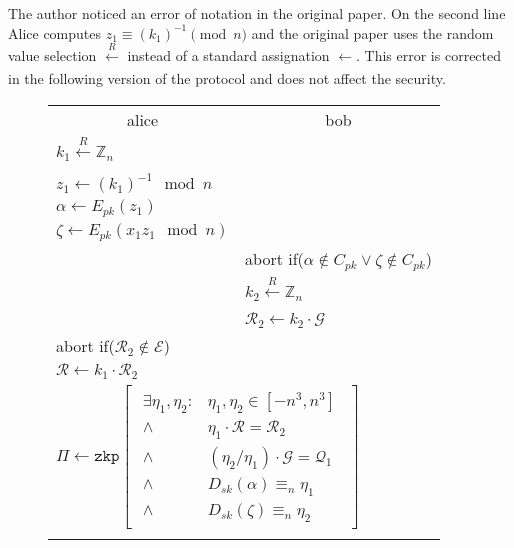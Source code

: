 The author noticed an error of notation in the original paper. On the second
line Alice computes $z_1 \equiv (k_1)^{-1} \pmod n$ and the original paper uses
the random value selection $\xleftarrow[]{R}$ instead of a standard assignation
$\leftarrow$. This error is corrected in the following version of the protocol
and does not affect the security.

\newpage

\begin{figure}[H]
    \begin{table}[H]
      \centering
      \begin{footnotesize}
      {\renewcommand{\arraystretch}{1.2}%
      \begin{tabular}{ | l l | }
        \hline
        \multicolumn{1}{|c}{alice}  & \multicolumn{1}{c|}{bob} \\
        $k_1 \xleftarrow[]{R} \mathbb{Z}_{n}$ & \\
        $z_1 \leftarrow (k_1)^{-1} \mod n$ & \\
        $\alpha \leftarrow E_{pk}(z_1)$ & \\
        $\zeta \leftarrow E_{pk}(x_1z_1 \mod n)$ & \\[2ex]
          & abort if($\alpha \notin C_{pk} \lor \zeta \notin C_{pk}$) \\
          & $k_2 \xleftarrow[]{R} \mathbb{Z}_{n}$ \\
          & $\mathcal{R}_2 \leftarrow k_2 \cdot \mathcal{G}$ \\[2ex]
        abort if($\mathcal{R}_2 \notin \mathcal{E}$) & \\
        $\mathcal{R} \leftarrow k_1 \cdot \mathcal{R}_2$ & \\
        \multicolumn{2}{|l|}{
        $\Pi \leftarrow \texttt{zkp} \begin{bmatrix}\begin{array}{lr}
                                      \exists \eta_1, \eta_2 : & \eta_1, \eta_2 \in [-n^3, n^3] \\
                                      \land & \eta_1 \cdot \mathcal{R} = \mathcal{R}_2 \\
                                      \land & (\eta_2/\eta_1) \cdot \mathcal{G} = \mathcal{Q}_1 \\
                                      \land & D_{sk}(\alpha) \equiv_n \eta_1 \\
                                      \land & D_{sk}(\zeta) \equiv_n \eta_2
                                     \end{array}\end{bmatrix}$ } \\ & \\

\end{tabular}}
\end{footnotesize}
\end{table}
\end{figure}
